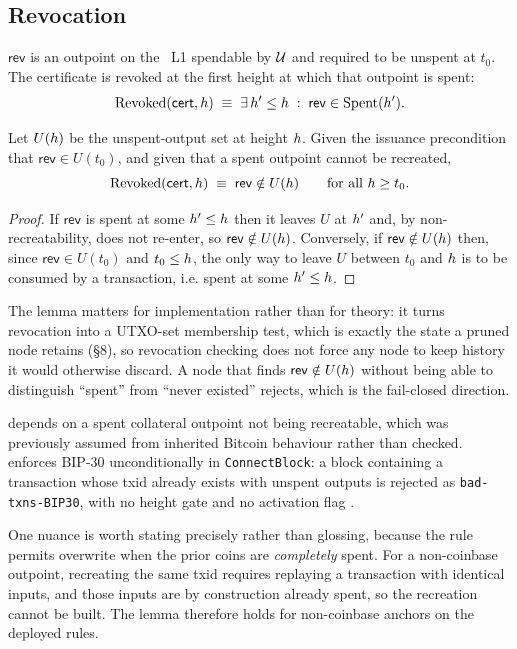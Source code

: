 \subsection{Revocation}
\label{sec:agent-identity:revoke}

\begin{definition}
\label{def:revoked}
$\mathsf{rev}$ is an outpoint on the \Flux\ L1 spendable by $\mathcal{U}$ and required to be unspent
at $t_0$. The certificate is revoked at the first height at which that outpoint is spent:
\[
  \mathrm{Revoked}(\mathsf{cert},h) \;\equiv\;
  \exists\, h' \le h \;:\; \mathsf{rev} \in \mathrm{Spent}(h').
\]
\end{definition}

\begin{lemma}
\label{lem:utxo-rev}
Let $U(h)$ be the unspent-output set at height $h$. Given the issuance precondition that
$\mathsf{rev} \in U(t_0)$, and given that a spent outpoint cannot be recreated,
\[
  \mathrm{Revoked}(\mathsf{cert},h) \;\equiv\; \mathsf{rev} \notin U(h)
  \qquad \text{for all } h \ge t_0 .
\]
\end{lemma}

\begin{proof}
If $\mathsf{rev}$ is spent at some $h' \le h$ then it leaves $U$ at $h'$ and, by
non-recreatability, does not re-enter, so $\mathsf{rev} \notin U(h)$. Conversely, if
$\mathsf{rev} \notin U(h)$ then, since $\mathsf{rev} \in U(t_0)$ and $t_0 \le h$, the only way
to leave $U$ between $t_0$ and $h$ is to be consumed by a transaction, i.e. spent at some
$h' \le h$. \qedhere
\end{proof}

The lemma matters for implementation rather than for theory: it turns revocation into a UTXO-set
membership test, which is exactly the state a pruned node retains (\S8), so revocation checking does
not force any node to keep history it would otherwise discard. A node that finds
$\mathsf{rev} \notin U(h)$ without being able to distinguish ``spent'' from ``never existed''
rejects, which is the fail-closed direction.
\begin{remark}
\label{rem:outpoint-verified}
 depends on a spent collateral outpoint not being recreatable, which was
previously assumed from inherited Bitcoin behaviour rather than checked. \fluxd{} enforces BIP-30
unconditionally in \texttt{ConnectBlock}: a block containing a transaction whose txid already exists
with unspent outputs is rejected as \texttt{bad-txns-BIP30}, with no height gate and no activation
flag \shipped {}.

One nuance is worth stating precisely rather than glossing, because the rule permits overwrite when
the prior coins are \emph{completely} spent. For a non-coinbase outpoint, recreating the same txid
requires replaying a transaction with identical inputs, and those
inputs are by construction already spent, so the recreation cannot be built. The lemma therefore
holds for non-coinbase anchors on the deployed rules.
\end{remark}

